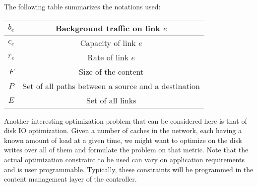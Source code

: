 \documentclass[conference]{IEEEtran}
\begin{document}
The following table summarizes the notations used:
\begin{center}
  \begin{tabular}{| c | c |}
    \hline
    $b_e$ & Background traffic on link $e$ \\ \hline
    $c_e$ & Capacity of link $e$ \\ \hline
    $r_e$ & Rate of link $e$ \\ \hline
    $F$ & Size of the content \\ \hline
    $P$ & Set of all paths between a source and a destination\\ \hline
    $E$ & Set of all links\\
    \hline
  \end{tabular}
\end{center}
Another interesting optimization problem that can be considered
here is that of disk IO optimization. Given a number of
caches in the network, each having a known amount of load
at a given time, we might want to optimize on the disk writes
over all of them and formulate the problem on that metric.
Note that the actual optimization constraint to be used can
vary on application requirements and is user programmable.
Typically, these constraints will be programmed in the content
management layer of the controller.
\end{document}
